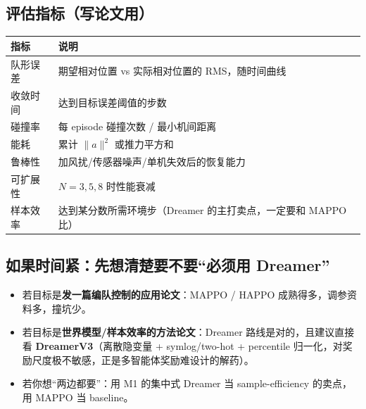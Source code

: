 \documentclass[11pt]{ctexart}
\begin{document}
\subsection{评估指标（写论文用）}
\begin{tabularx}{\textwidth}{L L}
\toprule
\textbf{指标} & \textbf{说明} \\
\midrule
队形误差 & 期望相对位置 vs 实际相对位置的 RMS，随时间曲线 \\
\addlinespace
收敛时间 & 达到目标误差阈值的步数 \\
\addlinespace
碰撞率 & 每 episode 碰撞次数 / 最小机间距离 \\
\addlinespace
能耗 & 累计 $\|a\|^2$ 或推力平方和 \\
\addlinespace
鲁棒性 & 加风扰/传感器噪声/单机失效后的恢复能力 \\
\addlinespace
可扩展性 & $N = 3,5,8$ 时性能衰减 \\
\addlinespace
样本效率 & 达到某分数所需环境步（Dreamer 的主打卖点，一定要和 MAPPO 比） \\
\bottomrule
\end{tabularx}

\subsection{如果时间紧：先想清楚要不要``必须用 Dreamer''}
\begin{itemize}
  \item 若目标是\textbf{发一篇编队控制的应用论文}：MAPPO / HAPPO 成熟得多，调参资料多，撞坑少。
  \item 若目标是\textbf{世界模型/样本效率的方法论文}：Dreamer 路线是对的，且建议直接看 \textbf{DreamerV3}（离散隐变量 + symlog/two-hot + percentile 归一化，对奖励尺度极不敏感，正是多智能体奖励难设计的解药）。
  \item 若你想``两边都要''：用 M1 的集中式 Dreamer 当 sample-efficiency 的卖点，用 MAPPO 当 baseline。
\end{itemize}

\end{document}
